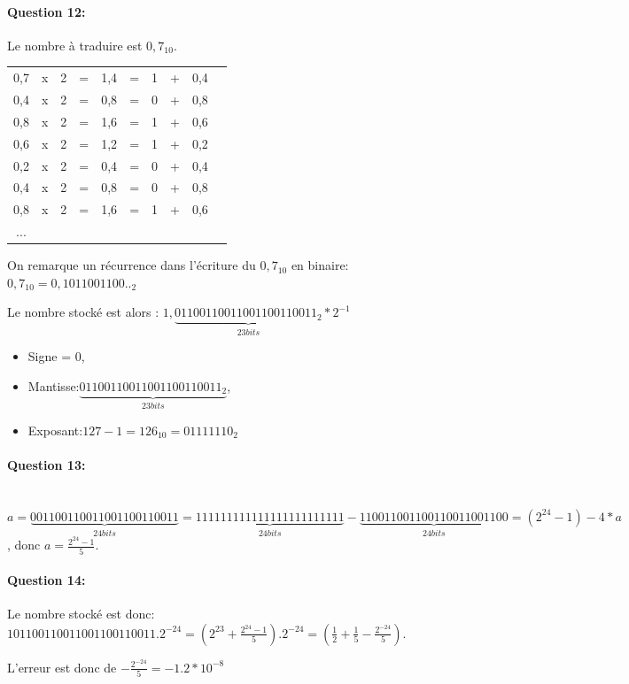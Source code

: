 \paragraph{Question 12:}

Le nombre à traduire est $0,7_{10}$.

\begin{tabular}{c c c c c c c c c c}
0,7 & x & 2 & = & 1,4 & = &  1 & + & 0,4 \\
0,4 & x & 2 & = & 0,8 & = &  0 & + & 0,8 \\
0,8 & x & 2 & = & 1,6 & = &  1 & + & 0,6 \\
0,6 & x & 2 & = & 1,2 & = &  1 & + & 0,2 \\
0,2 & x & 2 & = & 0,4 & = &  0 & + & 0,4 \\
0,4 & x & 2 & = & 0,8 & = &  0 & + & 0,8 \\
0,8 & x & 2 & = & 1,6 & = &  1 & + & 0,6 \\
...
\end{tabular}

On remarque un récurrence dans l'écriture du $0,7_{10}$ en binaire: $0,7_{10}=0,1011001100.._2$

Le nombre stocké est alors :
$1,\underbrace{01100110011001100110011_2}_{23 bits}*2^{-1}$

\begin{itemize}
 \item Signe = $0$,
 \item Mantisse:$\underbrace{01100110011001100110011_2}_{23 bits}$,
 \item Exposant:$127-1=126_{10}=01111110_2$
\end{itemize}

\paragraph{Question 13:} ~\ \\

$a=\underbrace{001100110011001100110011}_{24 bits}=\underbrace{111111111111111111111111}_{24 bits}-
\underbrace{110011001100110011001100}_{24 bits}=
(2^{24}-1)-4*a$, donc $a=\frac{2^{24}-1}{5}$.

\paragraph{Question 14:}

Le nombre stocké est donc: $101100110011001100110011.2^{-24}=(2^{23}+\frac{2^{24}-1}{5}).2^{-24}=(\frac{1}{2}+\frac{1}{5}-\frac{2^{-24}}{5})$.

L'erreur est donc de $-\frac{2^{-24}}{5}=-1.2*10^{-8}$


